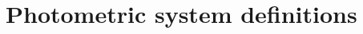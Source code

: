 \documentclass[a4paper, 11pt]{report}
\begin{document}
  \section{Photometric system definitions}
  \label{ap:cal_HA}
  
  
  
  
  \clearpage
  
%  
%
  


  

\clearpage

%



\end{document}
